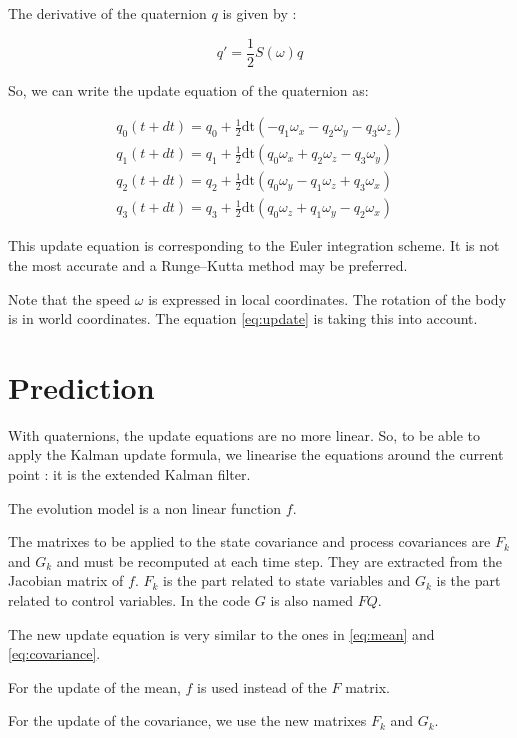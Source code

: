 \documentclass[titlepage,a4,12pt]{article}
\numberwithin{equation}{subsection}
\begin{document}
The derivative of the quaternion $q$ is given by :

\begin{equation}
q' = \frac{1}{2} S(\omega) q
\end{equation}

So, we can write the update equation of the quaternion as:

\begin{align} \label{eq:update}
q_0(t+dt) = q_0 + \frac{1}{2} \text{dt} (-q_1 \omega_x-q_2 \omega_y-q_3 \omega_z)\\
q_1(t+dt) = q_1 + \frac{1}{2} \text{dt} (q_0 \omega_x+q_2 \omega_z-q_3 \omega_y)\\
q_2(t+dt) = q_2 + \frac{1}{2} \text{dt} (q_0 \omega_y-q_1 \omega_z+q_3 \omega_x)\\
q_3(t+dt) = q_3 + \frac{1}{2} \text{dt} (q_0 \omega_z+q_1 \omega_y-q_2 \omega_x)
\end{align}

This update equation is corresponding to the Euler integration scheme.
It is not the most accurate and a Runge–Kutta method may be preferred. 

Note that the speed $\omega$ is expressed in local coordinates. The rotation of the body is in world coordinates. The equation \ref{eq:update} is taking this into account.


\section{Prediction}

With quaternions, the update equations are no more linear.
So, to be able to apply the Kalman update formula, we linearise the equations around the current point : it is the extended Kalman filter.

The evolution model is a non linear function $f$.

The matrixes to be applied to the state covariance and process covariances are $F_k$ and $G_k$ and must be recomputed at each time step. They are extracted from the Jacobian matrix of $f$. $F_k$ is the part related to state variables and $G_k$ is the part related to control variables. In the code $G$ is also named $FQ$. 

The new update equation is very similar to the ones in \ref{eq:mean} and \ref{eq:covariance}.

For the update of the mean, $f$ is used instead of the $F$ matrix.

For the update of the covariance, we use the new matrixes $F_k$ and $G_k$.
\end{document}

